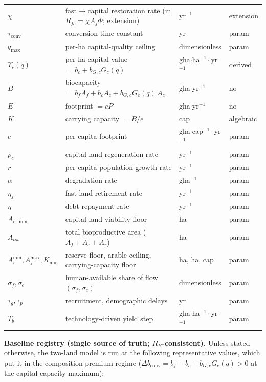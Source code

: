 \documentclass[11pt]{article}
\begin{document}
\begin{table}[htbp]
\begin{tabularx}{\textwidth}{>{\raggedright\arraybackslash}X>{\raggedright\arraybackslash}X>{\raggedright\arraybackslash}X>{\raggedright\arraybackslash}X}
$\chi$ & fast$\to$capital restoration rate (in $R_{fc}=\chi A_f\Phi$; extension) & yr$^{-1}$ & extension \\
$\tau_{\mathrm{conv}}$ & conversion time constant & yr & param \\
$q_{\max}$ & per-ha capital-quality ceiling & dimensionless & param \\
$\Upsilon_c(q)$ & per-ha capital value $=b_c+b_{G,c}G_c(q)$ & gha$\cdot$ha$^{-1}\cdot$yr$^{-1}$ & derived \\
$B$ & biocapacity $=b_f A_f+b_c A_c+b_{G,c}G_c(q)\,A_c$ & gha$\cdot$yr$^{-1}$ & no \\
$E$ & footprint $=eP$ & gha$\cdot$yr$^{-1}$ & no \\
$K$ & carrying capacity $=B/e$ & cap & algebraic \\
$e$ & per-capita footprint & gha$\cdot$cap$^{-1}\cdot$yr$^{-1}$ & param \\
$\rho_c$ & capital-land regeneration rate & yr$^{-1}$ & param \\
$r$ & per-capita population growth rate & yr$^{-1}$ & param \\
$\alpha$ & degradation rate & gha$^{-1}$ & param \\
$\eta_f$ & fast-land retirement rate & yr$^{-1}$ & param \\
$\eta$ & debt-repayment rate & yr$^{-1}$ & param \\
$A_{c,\min}$ & capital-land viability floor & ha & param \\
$A_{tot}$ & total bioproductive area ($A_f+A_c+A_r$) & ha & param \\
$A_r^{\min}, A_f^{\max}, K_{\min}$ & reserve floor, arable ceiling, carrying-capacity floor & ha, ha, cap & param \\
$\sigma_f,\sigma_c$ & human-available share of flow $(\sigma_f,\sigma_c)$ & dimensionless & param \\
$\tau_g,\tau_p$ & recruitment, demographic delays & yr & param \\
$T_b$ & technology-driven yield step & gha$\cdot$ha$^{-1}\cdot$yr$^{-1}$ & param \\
\bottomrule
\end{tabularx}
\end{table}

\noindent\textbf{Baseline registry (single source of truth; $R_B$-consistent).} Unless stated otherwise, the
two-land model is run at the following representative values, which put it in the composition-premium regime
($\Delta b_{\mathrm{conv}}=b_f-b_c-b_{G,c}G_c(q)>0$ at the capital capacity maximum):
\end{document}
